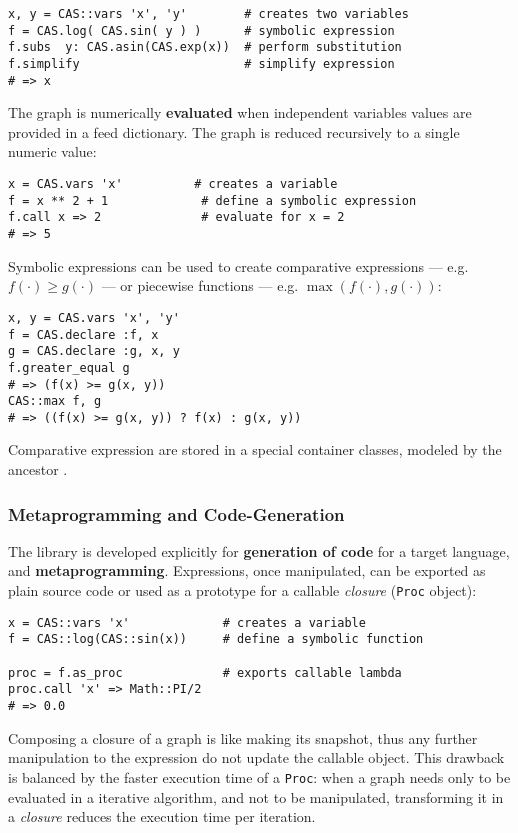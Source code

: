 \begin{lstlisting}[caption={Simplification example},label={code:example-simp}]
x, y = CAS::vars 'x', 'y'        # creates two variables
f = CAS.log( CAS.sin( y ) )      # symbolic expression
f.subs  y: CAS.asin(CAS.exp(x))  # perform substitution
f.simplify                       # simplify expression
# => x
\end{lstlisting}

The graph is numerically \textbf{evaluated} when independent variables values are provided in a feed dictionary. The graph is reduced recursively to a single numeric value:
\begin{lstlisting}[caption={Graph evaluation example},label={code:example-call}]
x = CAS.vars 'x'          # creates a variable
f = x ** 2 + 1             # define a symbolic expression
f.call x => 2              # evaluate for x = 2
# => 5
\end{lstlisting}

Symbolic expressions can be used to create comparative expressions --- e.g. $f(\cdot) \geq g(\cdot)$ --- or piecewise functions --- e.g. $\max(f(\cdot), g(\cdot))$:
\begin{lstlisting}[caption={Expressions and Piecewise functions},label={code:example-expr}]
x, y = CAS.vars 'x', 'y'
f = CAS.declare :f, x
g = CAS.declare :g, x, y
f.greater_equal g
# => (f(x) >= g(x, y))
CAS::max f, g
# => ((f(x) >= g(x, y)) ? f(x) : g(x, y))
\end{lstlisting}
Comparative expression are stored in a special container classes, modeled by the ancestor \CASExpression.

\subsubsection{Metaprogramming and Code-Generation}

The library is developed explicitly for \textbf{generation of code} for a target language, and \textbf{meta\-programming}. Expressions, once manipulated, can be exported as plain source code or used as a prototype for a callable \emph{closure} (\texttt{Proc} object):
\begin{lstlisting}[caption={Graph evaluation example},label={code:example-proc}]
x = CAS::vars 'x'             # creates a variable
f = CAS::log(CAS::sin(x))     # define a symbolic function

proc = f.as_proc              # exports callable lambda
proc.call 'x' => Math::PI/2
# => 0.0
\end{lstlisting}
Composing a closure of a graph is like making its snapshot, thus any further manipulation to the expression do not update the callable object. This drawback is balanced by the faster execution time of a \texttt{Proc}: when a graph needs only to be evaluated in a iterative algorithm, and not to be manipulated, transforming it in a \emph{closure} reduces the execution time per iteration.

